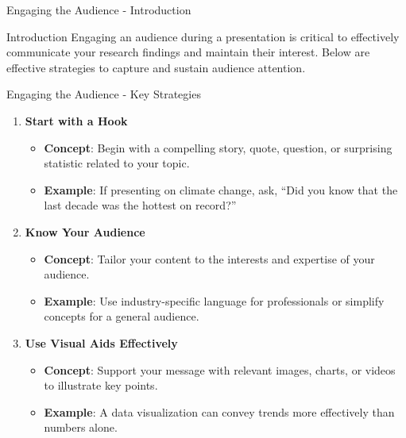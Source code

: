 \documentclass[aspectratio=169]{beamer}
\begin{document}
\begin{frame}[fragile]{Engaging the Audience - Introduction}
    \begin{block}{Introduction}
    Engaging an audience during a presentation is critical to effectively communicate your research findings and maintain their interest. Below are effective strategies to capture and sustain audience attention.
    \end{block}
\end{frame}

\begin{frame}[fragile]{Engaging the Audience - Key Strategies}
    \begin{enumerate}
        \item \textbf{Start with a Hook}
            \begin{itemize}
                \item \textbf{Concept}: Begin with a compelling story, quote, question, or surprising statistic related to your topic.
                \item \textbf{Example}: If presenting on climate change, ask, “Did you know that the last decade was the hottest on record?”
            \end{itemize}
        
        \item \textbf{Know Your Audience}
            \begin{itemize}
                \item \textbf{Concept}: Tailor your content to the interests and expertise of your audience.
                \item \textbf{Example}: Use industry-specific language for professionals or simplify concepts for a general audience.
            \end{itemize}
        
        \item \textbf{Use Visual Aids Effectively}
            \begin{itemize}
                \item \textbf{Concept}: Support your message with relevant images, charts, or videos to illustrate key points.
                \item \textbf{Example}: A data visualization can convey trends more effectively than numbers alone.
            \end{itemize}
    \end{enumerate}
\end{frame}
\end{document}
